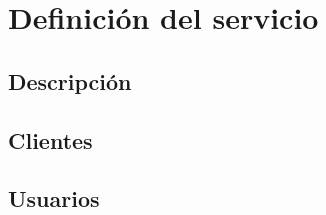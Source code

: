 \section{Definici\'on del servicio}
\subsection{Descripci\'on}
\subsection{Clientes}
\subsection{Usuarios}

